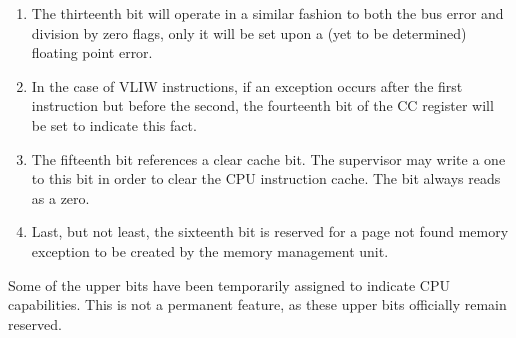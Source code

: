 \documentclass{gqtekspec}
\begin{document}
\begin{enumerate}
\item The thirteenth bit will operate in a similar fashion to both the bus
	error and division by zero flags, only it will be set upon a (yet to
	be determined) floating point error.

\item In the case of VLIW instructions, if an exception occurs after the first
	instruction but before the second, the fourteenth bit of the CC register
	will be set to indicate this fact.

\item The fifteenth bit references a clear cache bit.  The supervisor may
	write a one to this bit in order to clear the CPU instruction cache. 
	The bit always reads as a zero.

\item Last, but not least, the sixteenth bit is reserved for a page not found
	memory exception to be created by the memory management unit.

\end{enumerate}

Some of the upper bits have been temporarily assigned to indicate CPU
capabilities.  This is not a permanent feature, as these upper bits officially
remain reserved.
\end{document}
